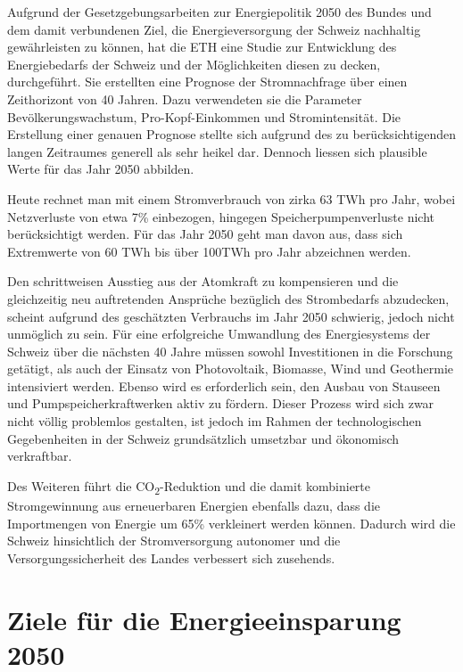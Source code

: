 Aufgrund der Gesetzgebungsarbeiten zur Energiepolitik 2050 des Bundes und dem damit verbundenen Ziel, die Energieversorgung der Schweiz nachhaltig gewährleisten zu können, hat die ETH eine Studie zur Entwicklung des Energiebedarfs der Schweiz und der Möglichkeiten diesen zu decken, durchgeführt. Sie erstellten eine Prognose der Stromnachfrage über einen Zeithorizont von 40 Jahren. Dazu verwendeten sie die Parameter Bevölkerungswachstum, Pro-Kopf-Einkommen und Stromintensität. Die Erstellung einer genauen Prognose stellte sich aufgrund des zu berücksichtigenden langen Zeitraumes generell als sehr heikel dar. Dennoch liessen sich plausible Werte für das Jahr 2050 abbilden.
\par
Heute rechnet man mit einem Stromverbrauch von zirka 63 TWh pro Jahr, wobei Netzverluste von etwa 7\% einbezogen, hingegen Speicherpumpenverluste nicht berücksichtigt werden. Für das Jahr 2050 geht man davon aus, dass sich Extremwerte von 60 TWh bis über 100TWh pro Jahr abzeichnen werden.
\par
Den schrittweisen Ausstieg aus der Atomkraft zu kompensieren und die gleichzeitig neu auftretenden Ansprüche bezüglich des Strombedarfs abzudecken, scheint aufgrund des geschätzten Verbrauchs im Jahr 2050 schwierig, jedoch nicht unmöglich zu sein. Für eine erfolgreiche Umwandlung des Energiesystems der Schweiz über die nächsten 40 Jahre müssen sowohl Investitionen in die Forschung getätigt, als auch der Einsatz von Photovoltaik, Biomasse, Wind und Geothermie intensiviert werden.
Ebenso wird es erforderlich sein, den Ausbau von Stauseen und Pumpspeicherkraftwerken aktiv zu fördern. Dieser Prozess wird sich zwar nicht völlig problemlos gestalten, ist jedoch im Rahmen der technologischen Gegebenheiten in der Schweiz grundsätzlich umsetzbar und ökonomisch verkraftbar.
\par
Des Weiteren führt die CO\textsubscript{2}-Reduktion und die damit kombinierte Stromgewinnung aus erneuerbaren Energien ebenfalls dazu, dass die Importmengen von Energie um 65\% verkleinert werden können. Dadurch wird die Schweiz hinsichtlich der Stromversorgung autonomer und die Versorgungssicherheit des Landes verbessert sich zusehends.
 


\section{Ziele für die Energieeinsparung 2050}






